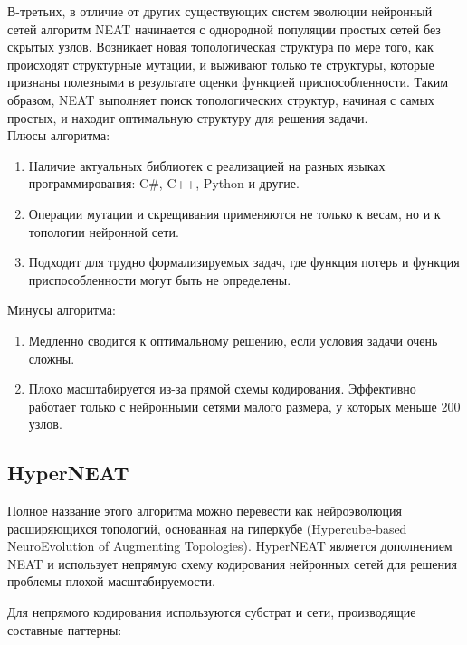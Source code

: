 В-третьих, в отличие от других существующих систем эволюции нейронный сетей алгоритм NEAT начинается с однородной популяции простых сетей без скрытых узлов. Возникает новая топологическая структура по мере того, как происходят структурные мутации, и выживают только те структуры, которые признаны полезными в результате оценки функцией приспособленности. Таким образом, NEAT выполняет поиск топологических структур, начиная с самых простых, и находит оптимальную структуру для решения задачи.\\
%
Плюсы алгоритма:
\begin{enumerate}[--]
    \item Наличие актуальных библиотек с реализацией на разных языках программирования: C\#, C++, Python и другие.
    \item Операции мутации и скрещивания применяются не только к весам, но и к топологии нейронной сети.
    \item Подходит для трудно формализируемых задач, где функция потерь и функция приспособленности могут быть не определены.
\end{enumerate}
%
Минусы алгоритма:
\begin{enumerate}[--]
    \item Медленно сводится к оптимальному решению, если условия задачи очень сложны. 
    \item Плохо масштабируется из-за прямой схемы кодирования. Эффективно работает только с нейронными сетями малого размера, у которых меньше 200 узлов. 
\end{enumerate}

\subsection{HyperNEAT}

Полное название этого алгоритма можно перевести как нейроэволюция расширяющихся топологий, основанная на гиперкубе (Hypercube-based NeuroEvolution of Augmenting Topologies). HyperNEAT является дополнением NEAT и использует непрямую схему кодирования нейронных сетей для решения проблемы плохой масштабируемости.

Для непрямого кодирования используются субстрат и сети, производящие составные паттерны:

